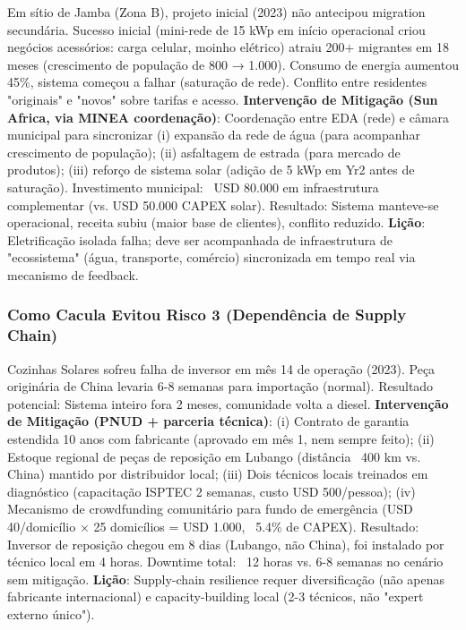 \documentclass[12pt, a4paper]{article}
\begin{document}
Em sítio de Jamba (Zona B), projeto inicial (2023) não antecipou migration secundária. Sucesso inicial (mini-rede de 15 kWp em início operacional criou negócios acessórios: carga celular, moinho elétrico) atraiu 200+ migrantes em 18 meses (crescimento de população de 800 → 1.000). Consumo de energia aumentou 45\%, sistema começou a falhar (saturação de rede). Conflito entre residentes "originais" e "novos" sobre tarifas e acesso.
\textbf{Intervenção de Mitigação (Sun Africa, via MINEA coordenação)}: Coordenação entre EDA (rede) e câmara municipal para sincronizar (i) expansão da rede de água (para acompanhar crescimento de população); (ii) asfaltagem de estrada (para mercado de produtos); (iii) reforço de sistema solar (adição de 5 kWp em Yr2 antes de saturação). Investimento municipal: ~USD 80.000 em infraestrutura complementar (vs. USD 50.000 CAPEX solar). Resultado: Sistema manteve-se operacional, receita subiu (maior base de clientes), conflito reduzido.
\textbf{Lição}: Eletrificação isolada falha; deve ser acompanhada de infraestrutura de "ecossistema" (água, transporte, comércio) sincronizada em tempo real via mecanismo de feedback.

\subsubsection*{Como Cacula Evitou Risco 3 (Dependência de Supply Chain)}

Cozinhas Solares sofreu falha de inversor em mês 14 de operação (2023). Peça originária de China levaria 6-8 semanas para importação (normal). Resultado potencial: Sistema inteiro fora 2 meses, comunidade volta a diesel.
\textbf{Intervenção de Mitigação (PNUD + parceria técnica)}: (i) Contrato de garantia estendida 10 anos com fabricante (aprovado em mês 1, nem sempre feito); (ii) Estoque regional de peças de reposição em Lubango (distância ~400 km vs. China) mantido por distribuidor local; (iii) Dois técnicos locais treinados em diagnóstico (capacitação ISPTEC 2 semanas, custo USD 500/pessoa); (iv) Mecanismo de crowdfunding comunitário para fundo de emergência (USD 40/domicílio × 25 domicílios = USD 1.000, ~5.4\% de CAPEX). Resultado: Inversor de reposição chegou em 8 dias (Lubango, não China), foi instalado por técnico local em 4 horas. Downtime total: ~12 horas vs. 6-8 semanas no cenário sem mitigação.
\textbf{Lição}: Supply-chain resilience requer diversificação (não apenas fabricante internacional) e capacity-building local (2-3 técnicos, não "expert externo único").
\end{document}

